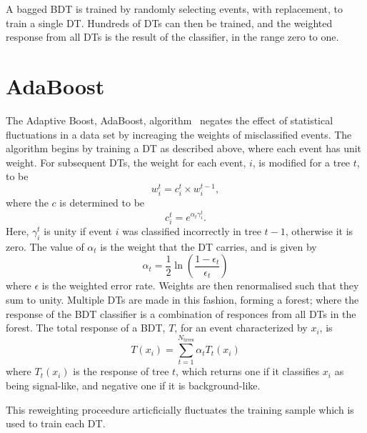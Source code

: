 A bagged BDT is trained by randomly selecting events, with replacement, to train a single DT.
Hundreds of DTs can then be trained, and the weighted response from all DTs is the result of the
classifier, in the range zero to one.





\section{AdaBoost}
\label{sec:bdt:ada}
The Adaptive Boost, AdaBoost, algorithm~\cite{AdaBoost} negates the effect of statistical
fluctuations in a data set by increaging the weights of misclassified events.
The algorithm begins by training a DT as described above, where each event has unit weight.
For subsequent DTs, the weight for each event, $i$, is modified for a tree $t$, to be
\begin{equation}
  w_i^t = c_i^t \times w_i^{t-1},
  \label{eq:ada:wt}
\end{equation}
where the $c$ is determined to be
\begin{equation}
  c_i^t = e^{\alpha_t\gamma_i^t}.
\end{equation}
Here, $\gamma_i^t$ is unity if event $i$ was classified incorrectly in tree $t-1$, otherwise it is
zero.
The value of $\alpha_t$ is the weight that the DT carries, and is given by
\begin{equation}
  \alpha_t = \frac12\ln\left(\frac{1-\epsilon_t}{\epsilon_t}\right)
\end{equation}
where $\epsilon$ is the weighted error rate.
Weights are then renormalised such that they sum to unity.
Multiple DTs are made in this fashion, forming a forest; where the response of the BDT classifier
is a combination of responces from all DTs in the forest.
The total response of a BDT, $T$, for an event characterized by $x_i$, is
\begin{equation}
  T(x_i) = \sum_{t=1}^{N_\mathrm{trees}} \alpha_tT_t(x_i)
  \label{eq:ada:fullbdt}
\end{equation}
where $T_t(x_i)$ is the response of tree $t$, which returns one if it classifies $x_i$ as being
signal-like, and negative one if it is background-like.

This reweighting proceedure articficially fluctuates the training sample which is used to train
each DT.


